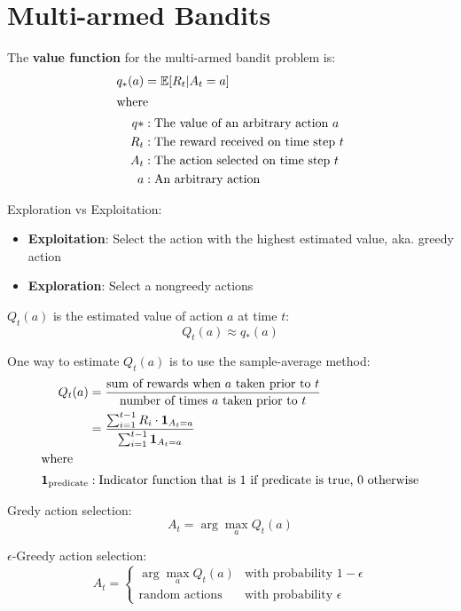 \section{Multi-armed Bandits}

The \textbf{value function} for the multi-armed bandit problem is:
\begin{align*}
    q_*(a) & = \mathbb{E}[R_t | A_t = a]                                    \\
    \intertext{where}
    q*     & : \text{The value of an arbitrary action } a                   \\
    R_t    & : \text{The reward received on time step } t                   \\
    A_t    & : \text{The action selected on time step } t                   \\
    a      & : \text{An arbitrary action}                                 \
\end{align*}

\noindent Exploration vs Exploitation:
\begin{itemize}
    \item \textbf{Exploitation}: Select the action with the highest estimated value, aka. greedy action
    \item \textbf{Exploration}: Select a nongreedy actions
\end{itemize}

\noindent $Q_t(a)$ is the estimated value of action $a$ at time $t$:
\[ Q_t(a) \approx q_*(a) \]

\noindent One way to estimate $Q_t(a)$ is to use the sample-average method:
\begin{align*}
    Q_t(a)                        & = \frac{\text{sum  of rewards when } a \text{ taken prior to }t }{\text{number of times } a \text{ taken prior to }t } \\
                                  & = \frac{\sum_{i=1}^{t-1} R_i \cdot \mathbf{1}_{A_t=a}}{\sum_{i=1}^{t-1} \mathbf{1}_{A_t=a}}                            \\
    \intertext{where}
    \mathbf{1}_{\text{predicate}} & : \text{Indicator function that is 1 if predicate is true, 0 otherwise}                                                \\
\end{align*}

\noindent Gredy action selection:
\[ A_t = \arg\max_a Q_t(a) \]

\noindent $\epsilon$-Greedy action selection:
\begin{equation*}
    A_t = \begin{cases}
        \arg\max_a Q_t(a)     & \text{with probability } 1 - \epsilon \\
        \text{random actions} & \text{with probability } \epsilon
    \end{cases}
\end{equation*}


